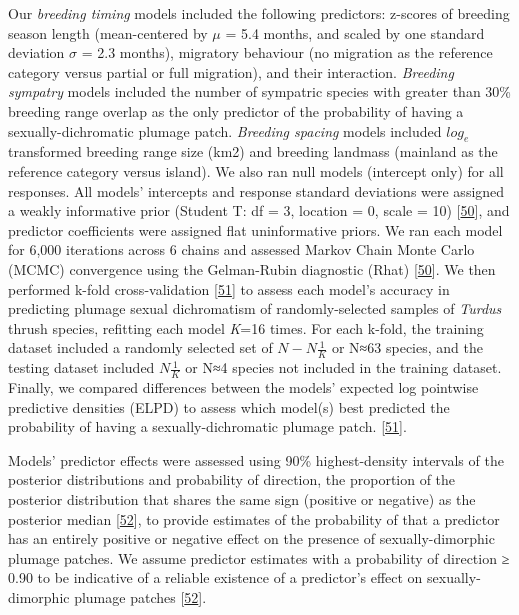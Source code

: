 \documentclass[
  a4paper,
]{article}
\begin{document}
Our \emph{breeding timing} models included the following predictors:
z-scores of breeding season length (mean-centered by \(\mu\) = 5.4
months, and scaled by one standard deviation \(\sigma\) = 2.3 months),
migratory behaviour (no migration as the reference category versus
partial or full migration), and their interaction. \emph{Breeding
sympatry} models included the number of sympatric species with greater
than 30\% breeding range overlap as the only predictor of the
probability of having a sexually-dichromatic plumage patch.
\emph{Breeding spacing} models included \(log_{e}\) transformed breeding
range size (km2) and breeding landmass (mainland as the reference
category versus island). We also ran null models (intercept only) for
all responses. All models' intercepts and response standard deviations
were assigned a weakly informative prior (Student T: df = 3, location =
0, scale = 10) {[}\protect\hyperlink{ref-gelman2013}{50}{]}, and
predictor coefficients were assigned flat uninformative priors. We ran
each model for 6,000 iterations across 6 chains and assessed Markov
Chain Monte Carlo (MCMC) convergence using the Gelman-Rubin diagnostic
(Rhat) {[}\protect\hyperlink{ref-gelman2013}{50}{]}. We then performed
k-fold cross-validation {[}\protect\hyperlink{ref-vehtari2017}{51}{]} to
assess each model's accuracy in predicting plumage sexual dichromatism
of randomly-selected samples of \emph{Turdus} thrush species, refitting
each model \emph{K}=16 times. For each k-fold, the training dataset
included a randomly selected set of \(N- N\frac{1}{K}\) or N≈63 species,
and the testing dataset included \(N\frac{1}{K}\) or N≈4 species not
included in the training dataset. Finally, we compared differences
between the models' expected log pointwise predictive densities (ELPD)
to assess which model(s) best predicted the probability of having a
sexually-dichromatic plumage patch.
{[}\protect\hyperlink{ref-vehtari2017}{51}{]}⁠.

Models' predictor effects were assessed using 90\% highest-density
intervals of the posterior distributions and probability of direction,
the proportion of the posterior distribution that shares the same sign
(positive or negative) as the posterior median
{[}\protect\hyperlink{ref-makowski2019}{52}{]}, to provide estimates of
the probability of that a predictor has an entirely positive or negative
effect on the presence of sexually-dimorphic plumage patches. We assume
predictor estimates with a probability of direction ≥ 0.90 to be
indicative of a reliable existence of a predictor's effect on
sexually-dimorphic plumage patches
{[}\protect\hyperlink{ref-makowski2019}{52}{]}.
\end{document}
